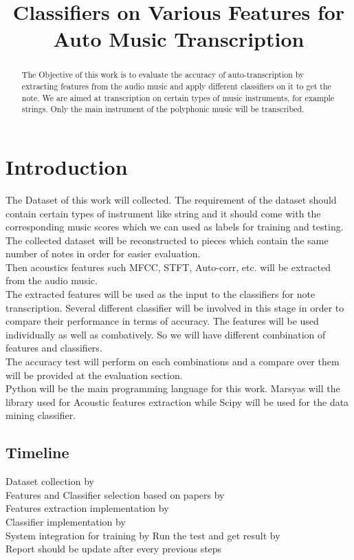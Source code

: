 \documentclass{article}
\title{Classifiers on Various Features for Auto Music Transcription \conferenceyear}
\begin{document}
%
\maketitle
%
\begin{abstract}
The Objective of this work is to evaluate the accuracy of auto-transcription by extracting features from the audio music and apply different classifiers on it to get the note. We are aimed at transcription on certain types of music instruments, for example strings. Only the main instrument of the polyphonic music will be transcribed.
\end{abstract}
%
\section{Introduction}\label{sec:introduction}
The Dataset of this work will collected. The requirement of the dataset should contain certain types of instrument like string and it should come with the corresponding music scores which we can used as labels for training and testing. The collected dataset will be reconstructed to pieces which contain the same number of notes in order for easier evaluation.\\
Then acoustics features such MFCC, STFT, Auto-corr, etc. will be extracted from the audio music. \\
The extracted features will be used as the input to the classifiers for note transcription. Several different classifier will be involved in this stage in order to compare their performance in terms of accuracy. The features will be used individually as well as combatively. So we will have different combination of features and classifiers.\\
The accuracy test will perform on each combinations and a compare over them will be provided at the evaluation section.\\
Python will be the main programming language for this work. Marsyas will the library used for Acoustic features extraction while Scipy  will be used for the data mining classifier. 


\subsection{Timeline}\label{subsec:Timeline}
Dataset collection by \\
Features and Classifier selection based on papers by\\
Features extraction implementation by\\
Classifier implementation by \\
System integration for training by
Run the test and get result by\\
Report should be update after every previous steps
\end{document}
